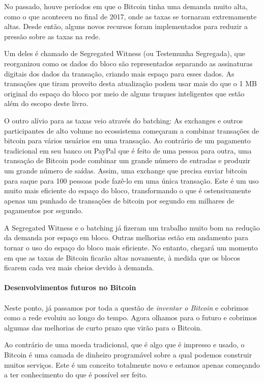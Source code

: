 No passado, houve períodos em que o Bitcoin tinha uma demanda muito alta, como o que aconteceu no final de 2017, onde as taxas se tornaram extremamente altas. Desde então, alguns novos recursos foram implementados para reduzir a pressão sobre as taxas na rede.

Um deles é chamado de Segregated Witness (ou Testemunha Segregada), que reorganizou como os dados do bloco são representados separando as assinaturas digitais dos dados da transação, criando mais espaço para esses dados. As transações que tiram proveito desta atualização podem usar mais do que o 1 MB original do espaço do bloco por meio de alguns truques inteligentes que estão além do escopo deste livro.

O outro alívio para as taxas veio através do batching: As exchanges e outros participantes de alto volume no ecossistema começaram a combinar transações de bitcoin para vários usuários em uma transação. Ao contrário de um pagamento tradicional em seu banco ou PayPal que é feito de uma pessoa para outra, uma transação de Bitcoin pode combinar um grande número de entradas e produzir um grande número de saídas. Assim, uma exchange que precisa enviar bitcoin para saque para 100 pessoas pode fazê-lo em uma única transação. Este é um uso muito mais eficiente do espaço do bloco, transformando o que é ostensivamente apenas um punhado de transações de bitcoin por segundo em milhares de pagamentos por segundo.

A Segregated Witness e o batching já fizeram um trabalho muito bom na redução da demanda por espaço em bloco. Outras melhorias estão em andamento para tornar o uso do espaço do bloco mais eﬁciente. No entanto, chegará um momento em que as taxas de Bitcoin ficarão altas novamente, à medida que os blocos ficarem cada vez mais cheios devido à demanda.
 
\paragraph{Desenvolvimentos futuros no Bitcoin}
\paragraph{}

Neste ponto, já passamos por toda a questão de \textit{inventar o Bitcoin} e cobrimos como a rede evoluiu ao longo do tempo. Agora olhamos para o futuro e cobrimos algumas das melhorias de curto prazo que virão para o Bitcoin.

Ao contrário de uma moeda tradicional, que é algo que é impresso e usado, o Bitcoin é uma camada de dinheiro programável sobre a qual podemos construir muitos serviços. Este é um conceito totalmente novo e estamos apenas começando a ter conhecimento do que é possível ser feito.


